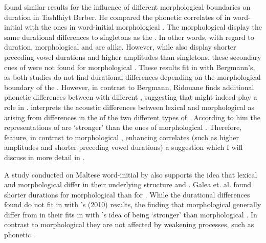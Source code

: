 \cite{Ridouane.2010} found similar results for the influence of different morphological boundaries on  duration in Tashlhiyt Berber. He compared the phonetic correlates of  in word-initial  with the ones in word-initial morphological . The morphological  display the same durational differences to singletons as the . In other words, with regard to duration, morphological and  are alike. However, while  also display shorter preceding vowel durations and higher amplitudes than singletons, these secondary cues of  were not found for morphological . These results fit in with Bergmann's, as both studies do not find durational differences depending on the morphological boundary of the . However, in contrast to Bergmann, Ridouane finds additional phonetic differences between  with different , suggesting that  might indeed play a role in . 
\cite{Ridouane.2010} interprets the acoustic differences between lexical and morphological  as arising from differences in the  of the two different types of .  According to him the representations of  are ‘stronger' than the ones of morphological . Therefore,  feature, in contrast to morphological , enhancing correlates (such as higher amplitudes and shorter preceding vowel durations)  \textendash a suggestion which I will discuss in more detail in . 

A study conducted on Maltese word-initial  by \cite{Galea.2014} also supports the idea that lexical and morphological  differ in their underlying structure and . Galea et. al. found shorter durations for morphological  than for . While the durational differences found do not fit in with \citeauthor{Ridouane.2010}'s (2010) results, the finding that morphological  generally differ from  in their  fits in with \citeauthor{Ridouane.2010}'s idea of  being `stronger' than morphological . In contrast to morphological  they are not affected by weakening processes, such as phonetic . 

